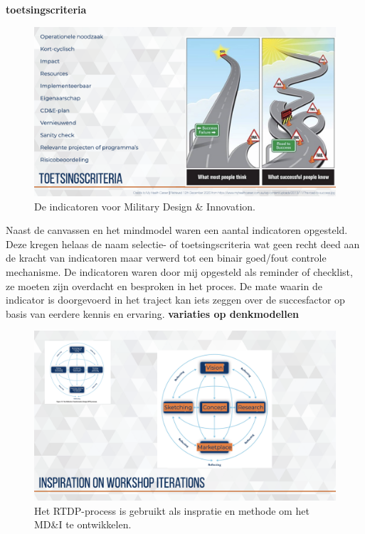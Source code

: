 \documentclass[
]{book}
\begin{document}
\textbf{toetsingscriteria}

\begin{figure}
\includegraphics[width=26.67in]{data/keynote-slides/20200430-CDE-Designprocess/20200430-CDE-Designprocess.024} \caption{De indicatoren voor Military Design \& Innovation.}\label{fig:unnamed-chunk-31}
\end{figure}

Naast de canvassen en het mindmodel waren een aantal indicatoren opgesteld. Deze kregen helaas de naam selectie- of toetsingscriteria wat geen recht deed aan de kracht van indicatoren maar verwerd tot een binair goed/fout controle mechanisme. De indicatoren waren door mij opgesteld als reminder of checklist, ze moeten zijn overdacht en besproken in het proces. De mate waarin de indicator is doorgevoerd in het traject kan iets zeggen over de succesfactor op basis van eerdere kennis en ervaring.
\textbf{variaties op denkmodellen}

\begin{figure}
\includegraphics[width=26.67in]{data/keynote-slides/20200430-CDE-Designprocess/20200430-CDE-Designprocess.024-1} \caption{Het RTDP-process is gebruikt als inspratie en methode om het MD\&I te ontwikkelen.}\label{fig:unnamed-chunk-32}
\end{figure}
\end{document}

